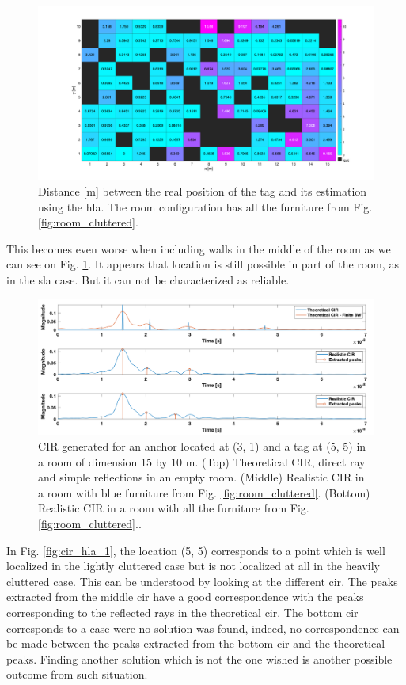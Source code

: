 \begin{figure}[H]
\centering
\includegraphics[width=.9\linewidth]{Images/hla_images/really_clut_(3_1).png}
\caption{Distance [m] between the real position of the tag and its estimation using the \gls{hla}. The room configuration has all the furniture from Fig. \ref{fig:room_cluttered}.\label{fig:hla_really_clut}}
\end{figure}

This becomes even worse when including walls in the middle of the room as we can see on Fig. \ref{fig:hla_really_clut}. It appears that location is still possible in part of the room,
as in the \gls{sla} case. But it can not be characterized as reliable.

\begin{figure}[H]
\centering
\includegraphics[width=.9\linewidth]{Images/hla_images/image_2.png}
\caption{CIR generated for an anchor located at (3, 1) and a tag at (5, 5) in a room of dimension 15 by 10 m. (Top) Theoretical CIR, direct ray and simple reflections in an empty room. (Middle) Realistic CIR in a room with blue furniture from Fig. \ref{fig:room_cluttered}. (Bottom) Realistic CIR in a room with all the furniture from Fig. \ref{fig:room_cluttered}.. \label{fig:cir_hla_2}}
\end{figure}

In Fig. \ref{fig:cir_hla_1}, the location (5, 5) corresponds to a point which is well localized in the lightly cluttered case but is not localized at all in the heavily cluttered case. This can be understood by looking at the different \gls{cir}. The peaks extracted from the middle \gls{cir} have a good correspondence with the peaks corresponding to the reflected rays in the theoretical \gls{cir}. The bottom \gls{cir} corresponds to a case were no solution was found, indeed, no correspondence can be made between the peaks extracted from the bottom \gls{cir} and the theoretical peaks. Finding another solution which is not the one wished is another possible outcome from such situation.

